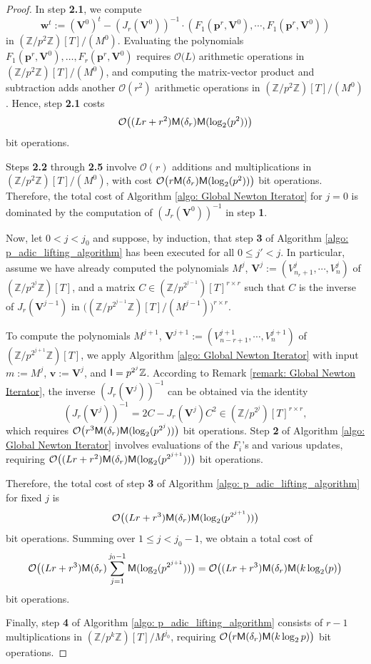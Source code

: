 \documentclass[pdflatex,sn-basic]{sn-jnl}%
\theoremstyle{thmstyleone}%
\theoremstyle{thmstyletwo}%
\theoremstyle{thmstylethree}%
\theoremstyle{definition}
\numberwithin{equation}{section}
\newcommand{\bfs}{\boldsymbol}
\newcommand{\Z}{\mathbb Z}
\begin{document}
\begin{proof}
In step {\bf 2.1}, we compute
$$
{\bfs w^t}:=({\bfs V^0})^t-(J_r(\bfs V^0))^{-1}\cdot (F_1({\bfs
p^r}, \bfs V^0), \cdots, F_1({\bfs p^r}, \bfs V^0))
$$
in $(\Z/p^2\Z)[T]/( M^0)$. Evaluating the polynomials $F_1({\bfs
p^r}, \bfs V^0), \ldots, F_r({\bfs p^r}, \bfs V^0)$ requires
$\mathcal{O}\bigl(L\bigr)$ arithmetic operations in $(\Z/p^2\Z)[T]/(
M^0)$, and computing the matrix-vector product and subtraction adds
another $\mathcal{O}(r^2)$ arithmetic operations in $(\Z/p^2\Z)[T]/(
M^0)$. Hence, step {\bf 2.1} costs
%
$$\mathcal{O}\bigl ((Lr+r^2){\sf
M}(\delta_r){\sf M}(\log_2(p^2))\bigr)$$
%
bit operations.

Steps {\bf 2.2} through {\bf 2.5} involve $\mathcal{O}(r)$ additions
and multiplications in $(\Z/p^2\Z)[T]/( M^0)$, with cost
$\mathcal{O}\bigl( r{\sf M}(\delta_r){\sf M}(\log_2(p^2))\bigr)$ bit
operations. Therefore, the total cost of Algorithm \ref{algo: Global
Newton Iterator} for $j=0$ is dominated by the computation of
$(J_r(\bfs V^0))^{-1}$ in step {\bf 1}.

Now, let $0 <  j < j_0$ and suppose, by induction, that step {\bf 3}
of Algorithm \ref{algo: p_adic_lifting_algorithm} has been executed
for all $0 \le j' < j$.  In particular, assume we have already
computed the polynomials $M^{j}$, $\bfs V^{j}:=(V^{j}_{n_r+1},
\cdots, V^{j}_n)$ of $(\Z/p^{2^{j}}\Z)[T]$, and a matrix $C\in
(\Z/p^{2^{j-1}})[T]^{r\times r}$ such that $C$ is the inverse of
$J_r(\bfs V^{j-1})$ in
$\bigl((\Z/p^{2^{j-1}}\Z)[T]/(M^{j-1})\bigr)^{r\times r}$.

To compute the polynomials $M^{j+1}$, $\bfs
V^{j+1}:=(V^{j+1}_{n-r+1}, \cdots, V^{j+1}_n)$ of
$(\Z/p^{2^{j+1}}\Z)[T]$, we apply Algorithm \ref{algo: Global Newton
Iterator} with input $m:=M^j$, ${\bfs v}:={\bfs V^{j}}$, and ${\sf
I}=p^{2^j}\Z$. According to Remark \ref{remark: Global Newton
Iterator}, the inverse $(J_r(\bfs V^j))^{-1}$ can be obtained via
the identity
%
$$(J_r(\bfs V^j))^{-1}=2C-J_r(\bfs V^j)C^2\in (\Z/p^{2^j})[T]^{r\times r},$$
%
which requires $\mathcal{O}\bigl(r^3{\sf M}(\delta_r){\sf
M}(\log_2(p^{2^j}))\bigr)$ bit operations. Step {\bf 2} of Algorithm
\ref{algo: Global Newton Iterator} involves evaluations of the
$F_i$'s and various updates, requiring $\mathcal{O}\bigl((Lr+r^2){\sf
M}(\delta_r){\sf M}(\log_2(p^{2^{j+1}}))\bigr)$ bit operations.

Therefore, the total cost of step {\bf 3} of Algorithm \ref{algo:
p_adic_lifting_algorithm} for fixed $j$ is
$$\mathcal{O}\bigl((Lr+r^3){\sf M}(\delta_r){\sf
M}(\log_2(p^{2^{j+1}}))\bigr)$$ bit operations. Summing over $1\le j
< j_0-1$, we obtain a total cost of
$$
\mathcal{O}\bigl((Lr+r^3){\sf M}(\delta_r)\sum_{j=1}^{j_0-1}{\sf
M}(\log_2(p^{2^{j+1}}))\bigr)=\mathcal{O}\bigl((Lr+r^3){\sf
M}(\delta_r){\sf M}(k\log_2(p)\bigr)
$$
bit operations.

Finally, step {\bf 4} of Algorithm \ref{algo:
p_adic_lifting_algorithm} consists of $r-1$ multiplications in
$(\Z/p^{k}\Z)[T]/M^{j_0}$, requiring $\mathcal{O}\bigl(r{\sf
M}(\delta_r){\sf M}(k\log_2 p)\bigr)$ bit operations.
\end{proof}
\end{document}
